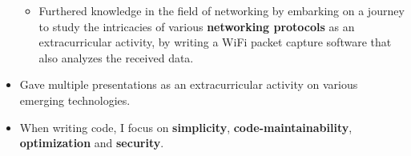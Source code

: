 \documentclass[11pt,a4paper,sans]{moderncv}
\begin{document}
\begin{itemize}
\begin{itemize}
		\item	Furthered knowledge in the field of networking by embarking on a journey to study the intricacies of various \textbf{networking protocols} as an extracurricular activity, by writing a WiFi packet capture software that also analyzes the received data.
		\end{itemize}
	\item	Gave multiple presentations as an extracurricular activity on various emerging technologies.
	\item	When writing code, I focus on \textbf{simplicity}, \textbf{code-maintainability}, \textbf{optimization} and \textbf{security}.
	\end{itemize}

\end{document}
